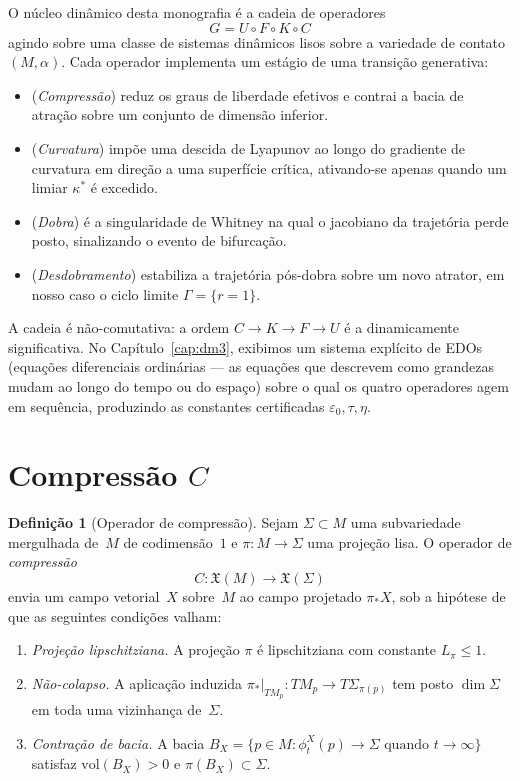 \documentclass[12pt,a4paper,twoside]{book}
\theoremstyle{plain}
\theoremstyle{definition}
\theoremstyle{definition}
\newtheorem{definicao}[teorema]{Definição}
\newcommand{\epsz}{\varepsilon_{0}}
\newcommand{\tribo}{\eta}
\begin{document}
O núcleo dinâmico desta monografia é a cadeia de operadores
\begin{equation}\label{eq:cadeia}
  G = U \circ F \circ K \circ C
\end{equation}
agindo sobre uma classe de sistemas dinâmicos lisos sobre a variedade
de contato $(M,\alpha)$. Cada operador implementa um estágio de uma
transição generativa:
\begin{itemize}
  \item[$C$] (\emph{Compressão}) reduz os graus de liberdade efetivos e
        contrai a bacia de atração sobre um conjunto de dimensão inferior.
  \item[$K$] (\emph{Curvatura}) impõe uma descida de Lyapunov ao longo do
        gradiente de curvatura em direção a uma superfície crítica,
        ativando-se apenas quando um limiar $\kappa^{\ast}$ é excedido.
  \item[$F$] (\emph{Dobra}) é a singularidade de Whitney na qual o
        jacobiano da trajetória perde posto, sinalizando o evento de
        bifurcação.
  \item[$U$] (\emph{Desdobramento}) estabiliza a trajetória pós-dobra
        sobre um novo atrator, em nosso caso o ciclo limite
        $\Gamma = \{r=1\}$.
\end{itemize}
A cadeia é não-comutativa: a ordem $C \to K \to F \to U$ é a
dinamicamente significativa. No Capítulo~\ref{cap:dm3}, exibimos um
sistema explícito de EDOs (equações diferenciais ordinárias --- as
equações que descrevem como grandezas mudam ao longo do tempo ou do espaço)
sobre o qual os quatro operadores agem em
sequência, produzindo as constantes certificadas $\epsz, \tau, \tribo$.

\section{Compressão $C$}
\label{sec:operador-C}

\begin{definicao}[Operador de compressão]\label{def:op-C}
Sejam $\Sigma \subset M$ uma subvariedade mergulhada de~$M$ de codimensão~$1$
e $\pi : M \to \Sigma$ uma projeção lisa. O operador de \emph{compressão}
\[
  C : \mathfrak{X}(M) \to \mathfrak{X}(\Sigma)
\]
envia um campo vetorial~$X$ sobre~$M$ ao campo projetado $\pi_{\ast}X$,
sob a hipótese de que as seguintes condições valham:
\begin{enumerate}[label=\textup{(C\arabic*)}]
  \item \emph{Projeção lipschitziana.} A projeção $\pi$ é lipschitziana com
        constante $L_{\pi} \le 1$.
  \item \emph{Não-colapso.} A aplicação induzida
        $\pi_{\ast}|_{TM_{p}} : TM_{p} \to T\Sigma_{\pi(p)}$ tem posto
        $\dim\Sigma$ em toda uma vizinhança de~$\Sigma$.
  \item \emph{Contração de bacia.} A bacia
        $B_{X} = \{p \in M : \phi_{t}^{X}(p) \to \Sigma \text{ quando } t \to \infty\}$
        satisfaz $\mathrm{vol}(B_{X}) > 0$ e $\pi(B_{X}) \subset \Sigma$.
\end{enumerate}
\end{definicao}
\end{document}
